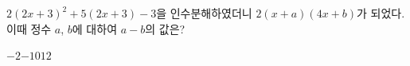 $2(2x+3)^2+5(2x+3)-3$을 인수분해하였더니 $2(x+a)(4x+b)$가 되었다. 이때 정수 $a$, $b$에 대하여 $a-b$의 값은?
\begin{choices32}{$-2$}{$-1$}{$0$}{$1$}{$2$}\end{choices32}
